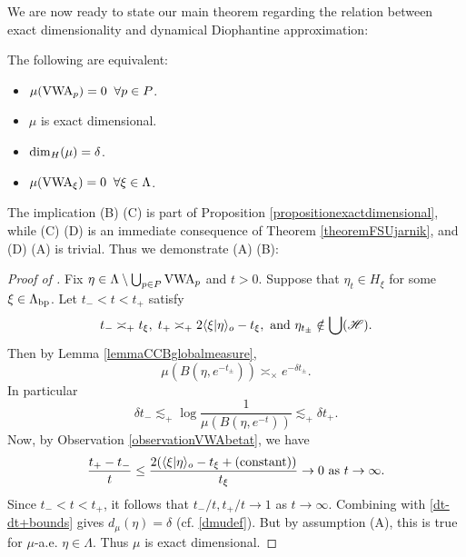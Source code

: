 We are now ready to state our main theorem regarding the relation between exact dimensionality and dynamical Diophantine approximation:

\begin{theorem}
\label{theoremequivalentVWA}
The following are equivalent:
\begin{itemize}
\item[(A)] $\mu(\mathrm{VWA}_p) = 0\;\;\forall p\in P$.
\item[(B)] $\mu$ is exact dimensional.
\item[(C)] ${\dim_H}(\mu) = \delta$.
\item[(D)] $\mu(\mathrm{VWA}_\xi) = 0\;\;\forall \xi\in\Lambda$.
\end{itemize}
\end{theorem}
The implication (B) \implies (C) is part of Proposition \ref{propositionexactdimensional}, while (C) \implies (D) is an immediate consequence of Theorem \ref{theoremFSUjarnik}, and (D) \implies (A) is trivial. Thus we demonstrate (A) \implies (B):

\begin{proof}[Proof of ]
Fix $\eta\in\Lambda\setminus\bigcup_{p\in P}\mathrm{VWA}_p$ and $t > 0$. Suppose that $\eta_t\in H_\xi$ for some $\xi\in\Lambda_{\mathrm{bp}}$. Let $t_- < t < t_+$ satisfy
\[
t_- \asymp_+ t_\xi, \; t_+ \asymp_+ 2\langle \xi|\eta\rangle_o - t_\xi, \textup{ and } \eta_{t_\pm} \notin\bigcup(\mathscr H).
\]
Then by Lemma \ref{lemmaCCBglobalmeasure},
\[
\mu(B(\eta,e^{-t_\pm})) \asymp_\times e^{-\delta t_\pm}.
\]
In particular
\begin{equation}
\label{dt-dt+bounds}
\delta t_- \lesssim_\plus \log\frac{1}{\mu(B(\eta,e^{-t}))} \lesssim_\plus \delta t_+.
\end{equation}
Now, by Observation \ref{observationVWAbetat}, we have
\[
\frac{t_+ - t_-}{t} \leq \frac{2(\langle \xi|\eta\rangle_o - t_\xi + (\textup{constant}))}{t_\xi} \to 0 \textup{ as } t\to\infty.
\]
Since $t_- < t < t_+$, it follows that $t_-/t,t_+/t\to 1$ as $t\to \infty$. Combining with \eqref{dt-dt+bounds} gives $d_\mu(\eta) = \delta$ (cf. \eqref{dmudef}). But by assumption (A), this is true for $\mu$-a.e. $\eta\in\Lambda$. Thus $\mu$ is exact dimensional.
\end{proof}

